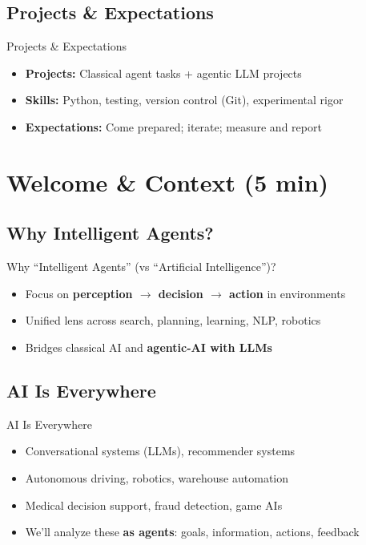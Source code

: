 \documentclass[aspectratio=169]{beamer}
\begin{document}
\subsection{Projects \& Expectations}
\begin{frame}{Projects \& Expectations}
\begin{itemize}
  \item \textbf{Projects:} Classical agent tasks + agentic LLM projects
  \item \textbf{Skills:} Python, testing, version control (Git), experimental rigor
  \item \textbf{Expectations:} Come prepared; iterate; measure and report
\end{itemize}
\end{frame}

\section{Welcome \& Context (5 min)}

\subsection{Why Intelligent Agents?}
\begin{frame}{Why “Intelligent Agents” (vs “Artificial Intelligence”)?}
\begin{itemize}
  \item Focus on \textbf{perception $\rightarrow$ decision $\rightarrow$ action} in environments
  \item Unified lens across search, planning, learning, NLP, robotics
  \item Bridges classical AI and \textbf{agentic-AI with LLMs}
\end{itemize}
\end{frame}

\subsection{AI Is Everywhere}
\begin{frame}{AI Is Everywhere}
\begin{itemize}
  \item Conversational systems (LLMs), recommender systems
  \item Autonomous driving, robotics, warehouse automation
  \item Medical decision support, fraud detection, game AIs
  \item We’ll analyze these \textbf{as agents}: goals, information, actions, feedback
\end{itemize}
\end{frame}
\end{document}
